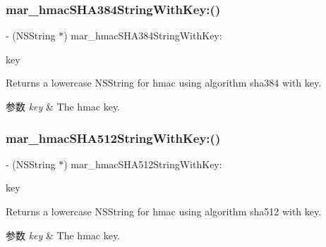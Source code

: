 \subsubsection{\texorpdfstring{mar\+\_\+hmac\+S\+H\+A384\+String\+With\+Key\+:()}{mar\_hmacSHA384StringWithKey:()}}
{\footnotesize\ttfamily -\/ (N\+S\+String $\ast$) mar\+\_\+hmac\+S\+H\+A384\+String\+With\+Key\+: \begin{DoxyParamCaption}\item[{(N\+S\+String $\ast$)}]{key }\end{DoxyParamCaption}}

Returns a lowercase N\+S\+String for hmac using algorithm sha384 with key. 
\begin{DoxyParams}{参数}
{\em key} & The hmac key. \\
\hline
\end{DoxyParams}
\mbox{\label{category_n_s_string_07_m_a_r_e_x_08_acf50b67a5e5a8a6065546a8e115a9d9e}} 
\subsubsection{\texorpdfstring{mar\+\_\+hmac\+S\+H\+A512\+String\+With\+Key\+:()}{mar\_hmacSHA512StringWithKey:()}}
{\footnotesize\ttfamily -\/ (N\+S\+String $\ast$) mar\+\_\+hmac\+S\+H\+A512\+String\+With\+Key\+: \begin{DoxyParamCaption}\item[{(N\+S\+String $\ast$)}]{key }\end{DoxyParamCaption}}

Returns a lowercase N\+S\+String for hmac using algorithm sha512 with key. 
\begin{DoxyParams}{参数}
{\em key} & The hmac key. \\
\hline
\end{DoxyParams}
\mbox{\label{category_n_s_string_07_m_a_r_e_x_08_aab8afcd751a3ae6d85e9cd6e2d4fc783}} 
